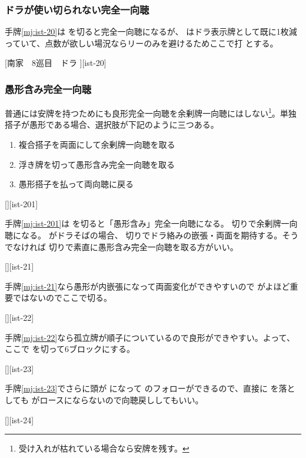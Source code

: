 \documentclass[10pt, twocolumn]{article}
\begin{document}
\subsubsection*{ドラが使い切られない完全一向聴}

手牌\ref{mj:ist-20}は  を切ると完全一向聴になるが、 はドラ表示牌として既に1枚減っていて、点数が欲しい場況ならリーのみを避けるためここで打  とする\citep[][p. 19]{ishibashi-black}。

[南家　8巡目　ドラ ][ist-20]

\subsubsection*{愚形含み完全一向聴}

普通には安牌を持つためにも良形完全一向聴を余剰牌一向聴にはしない\footnote{受け入れが枯れている場合なら安牌を残す。}\citep{gendai-iishanten-choice-1}。単独搭子が愚形である場合、選択肢が下記のように三つある。

\begin{enumerate}
\item 複合搭子を両面にして余剰牌一向聴を取る
\item 浮き牌を切って愚形含み完全一向聴を取る
\item 愚形搭子を払って両向聴に戻る
\end{enumerate}

[][ist-201]

手牌\ref{mj:ist-201}は  を切ると「愚形含み」完全一向聴になる。 切りで余剰牌一向聴になる。 がドラそばの場合、 切りでドラ絡みの嵌張・両面を期待する。そうでなければ  切りで素直に愚形含み完全一向聴を取る方がいい。

[][ist-21]

手牌\ref{mj:ist-21}なら愚形が内嵌張になって両面変化ができやすいので  がよほど重要ではないのでここで切る。

[][ist-22]

手牌\ref{mj:ist-22}なら孤立牌が順子についているので良形ができやすい。よって、ここで  を切って6ブロックにする。

[][ist-23]

手牌\ref{mj:ist-23}でさらに頭が  になって  のフォローができるので、直接に  を落としても  がロースにならないので向聴戻ししてもいい。

[][ist-24]
\end{document}
